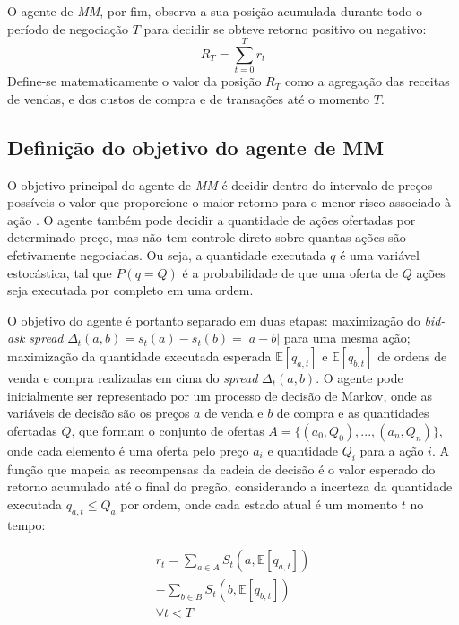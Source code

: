 O agente de \textit{MM}, por fim, observa a sua posição acumulada durante todo o período de negociação $T$ para decidir se obteve retorno positivo ou negativo:
\begin{equation} \label{return_accumulated}
    R_{T} = \sum_{t=0}^{T} r_t
\end{equation}
Define-se matematicamente o valor da posição $R_T$ como a agregação das receitas de vendas, e dos custos de compra e de transações até o momento $T$. 

\subsection{Definição do objetivo do agente de MM}
O objetivo principal do agente de \textit{MM} é decidir dentro do intervalo de preços possíveis o valor que proporcione o maior retorno para o menor risco associado à ação \citep{markowitz1952}. O agente também pode decidir a quantidade de ações ofertadas por determinado preço, mas não tem controle direto sobre quantas ações são efetivamente negociadas. Ou seja, a quantidade executada $q$ é uma variável estocástica, tal que $P(q = Q)$ é a probabilidade de que uma oferta de $Q$ ações seja executada por completo em uma ordem. 

O objetivo do agente é portanto separado em duas etapas: maximização do \textit{bid-ask spread} $\Delta_{t}(a, b) = s_{t}(a) - s_{t}(b) = |a - b|$  para uma mesma ação; maximização da quantidade executada esperada $\mathbb{E} [q_{a, t}]$ e $\mathbb{E} [q_{b, t}]$ de ordens de venda e compra realizadas em cima do \textit{spread} $\Delta_{t}(a, b)$. O agente pode inicialmente ser representado por um processo de decisão de Markov, onde as variáveis de decisão são os preços $a$ de venda e $b$ de compra e as quantidades ofertadas $Q$, que formam o conjunto de ofertas $A = \{(a_{0}, Q_{0}), ..., (a_{n}, Q_{n})\}$, onde cada elemento é uma oferta pelo preço $a_{i}$ e quantidade $Q_{i}$ para a ação $i$. A função que mapeia as recompensas da cadeia de decisão é o valor esperado do retorno acumulado até o final do pregão, considerando a incerteza da quantidade executada $q_{a, t} \leq Q_{a}$ por ordem, onde cada estado atual é um momento $t$ no tempo:

\begin{equation} \label{return}
	\begin{aligned}
		r_{t} = \sum_{a \in A} S_{t}(a, \mathbb{E}[q_{a, t}]) \\
		-\sum_{b \in B} S_{t}(b, \mathbb{E}[q_{b, t}]) \\
		\forall t < T
	\end{aligned}
\end{equation}


